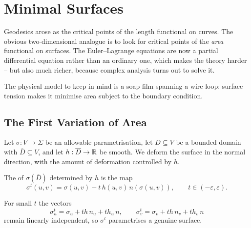 \documentclass[a4paper]{scrartcl}
\begin{document}
\section{Minimal Surfaces}

Geodesics arose as the critical points of the length functional on curves. The obvious two-dimensional analogue is to look for critical points of the \emph{area} functional on surfaces. The Euler--Lagrange equations are now a partial differential equation rather than an ordinary one, which makes the theory harder -- but also much richer, because complex analysis turns out to solve it.

The physical model to keep in mind is a soap film spanning a wire loop: surface tension makes it minimise area subject to the boundary condition.

\subsection{The First Variation of Area}

Let $\sigma: V \rightarrow \Sigma$ be an allowable parametrisation, let $D \subseteq V$ be a bounded domain with $\overline D \subseteq V$, and let $h: \overline D \rightarrow \mathbb{R}$ be smooth. We deform the surface in the normal direction, with the amount of deformation controlled by $h$.

\begin{definition}
    The  of $\sigma(\overline D)$ determined by $h$ is the map
    $$
    \sigma^t(u,v) = \sigma(u,v) + t\,h(u,v)\,n(\sigma(u,v)), \qquad t \in (-\varepsilon,\varepsilon).
    $$
\end{definition}

For small $t$ the vectors
$$
\sigma^t_u = \sigma_u + th\,n_u + th_u\, n, \qquad \sigma^t_v = \sigma_v + th\,n_v + th_v\,n
$$
remain linearly independent, so $\sigma^t$ parametrises a genuine surface.
\end{document}
